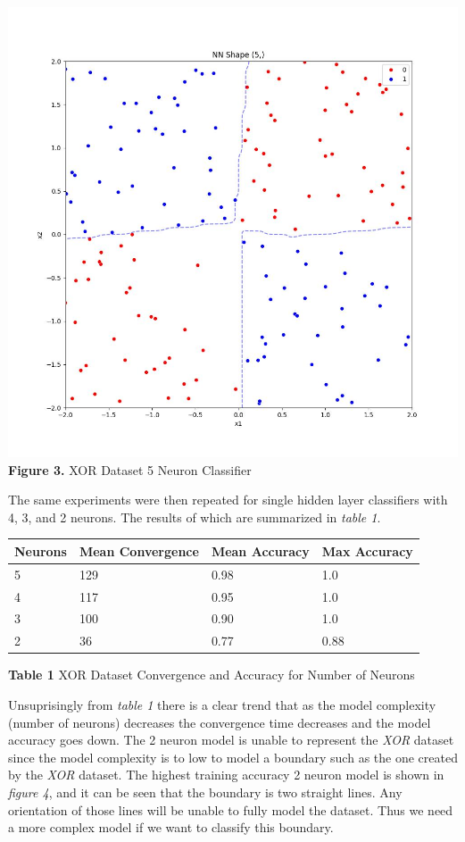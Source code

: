 \documentclass[11pt]{article}
\begin{document}
\includegraphics{figures/xor_5_clf.jpg}\\
\textbf{Figure 3.} XOR Dataset 5 Neuron Classifier

The same experiments were then repeated for single hidden layer
classifiers with 4, 3, and 2 neurons. The results of which are
summarized in \emph{table 1}.

\begin{longtable}[]{@{}llll@{}}
\toprule
Neurons & Mean Convergence & Mean Accuracy & Max Accuracy \\
\midrule
\endhead
5 & 129 & 0.98 & 1.0 \\
4 & 117 & 0.95 & 1.0 \\
3 & 100 & 0.90 & 1.0 \\
2 & 36 & 0.77 & 0.88 \\
\bottomrule
\end{longtable}

\textbf{Table 1} XOR Dataset Convergence and Accuracy for Number of
Neurons

Unsuprisingly from \emph{table 1} there is a clear trend that as the
model complexity (number of neurons) decreases the convergence time
decreases and the model accuracy goes down. The 2 neuron model is unable
to represent the \emph{XOR} dataset since the model complexity is to low
to model a boundary such as the one created by the \emph{XOR} dataset.
The highest training accuracy 2 neuron model is shown in \emph{figure
4}, and it can be seen that the boundary is two straight lines. Any
orientation of those lines will be unable to fully model the dataset.
Thus we need a more complex model if we want to classify this boundary.
\end{document}
